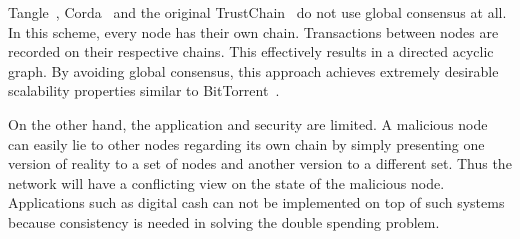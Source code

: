 Tangle~\cite{tangle}, Corda~\cite{corda} and the original TrustChain~\cite{multichain} do not use global consensus at all.
In this scheme, every node has their own chain.
Transactions between nodes are recorded on their respective chains.
This effectively results in a directed acyclic graph.
By avoiding global consensus, this approach achieves extremely desirable scalability properties similar to BitTorrent~\cite{cohen2003incentives}.

On the other hand, the application and security are limited.
A malicious node can easily lie to other nodes regarding its own chain by simply presenting one version of reality to a set of nodes and another version to a different set.
Thus the network will have a conflicting view on the state of the malicious node.
Applications such as digital cash can not be implemented on top of such systems because consistency is needed in solving the double spending problem.
